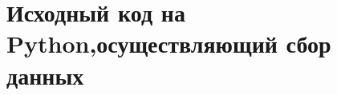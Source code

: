\documentclass[bachelor, och, referat, times]{SCWorks}
\begin{document}
%




\appendix

\section{Исходный код на Python,осуществляющий сбор данных} 
\label{code}
\inputminted{python3}{../collect.py}
\end{document}
